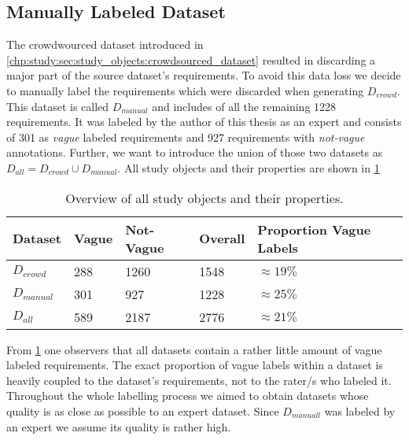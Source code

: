 \subsection{Manually Labeled Dataset}
\label{chp:study:sec:study_objects:dataset_creation:manual_labeling}
The crowdwourced dataset introduced in \cref{chp:study:sec:study_objects:crowdsourced_dataset} resulted in discarding a major part of the source dataset's requirements.
To avoid this data loss we decide to manually label the requirements which were discarded when generating $D_{crowd}$.
This dataset is called $D_{manual}$ and includes of all the remaining 1228 requirements.
It was labeled by the author of this thesis as an expert and consists of 301 as \textit{vague} labeled requirements and 927 requirements with \textit{not-vague} annotations.
Further, we want to introduce the union of those two datasets as $D_{all} = D_{crowd} \cup D_{manual}$.
All study objects and their properties are shown in \cref{tab:study:objects:all_datasets}
\newpage
\begin{table}[htpb]
    \centering
    \begin{tabular}{l l l l l}
        \toprule
        Dataset & Vague & Not-Vague & Overall & Proportion Vague Labels \\
        \midrule
        $D_{crowd}$ & 288 & 1260 & 1548 & $\approx19\%$\\
        $D_{manual}$ & 301 & 927 & 1228 & $\approx25\%$\\
        \midrule
        $D_{all}$ & 589 & 2187 & 2776 &  $\approx21\%$\\
        \bottomrule
    \end{tabular}
    \caption[Overview of all study objects]{Overview of all study objects and their properties.}\label{tab:study:objects:all_datasets}
\end{table}

From \cref{tab:study:objects:all_datasets} one observers that all datasets contain a rather little amount of vague labeled requirements.
The exact proportion of vague labels within a dataset is heavily coupled to the dataset's requirements, not to the rater/s who labeled it.
Throughout the whole labelling process we aimed to obtain datasets whose quality is as close as possible to an expert dataset.
Since $D_{manuall}$ was labeled by an expert we assume its quality is rather high.
